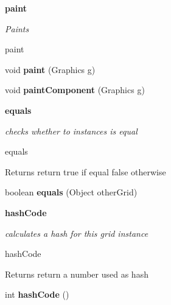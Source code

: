 \begin{Indent}{\bf paint}\par
{\em Paints

paint }\begin{DoxyCompactItemize}
\item 
\hypertarget{classbattleship_1_1gameboard_1_1Grid_ae7aef2ca5af778af7e8582bcaa65d1d0}{}void {\bfseries paint} (Graphics g)\label{classbattleship_1_1gameboard_1_1Grid_ae7aef2ca5af778af7e8582bcaa65d1d0}

\item 
\hypertarget{classbattleship_1_1gameboard_1_1Grid_ad3a041a89cb4f0dc4e754883e577a6f3}{}void {\bfseries paint\+Component} (Graphics g)\label{classbattleship_1_1gameboard_1_1Grid_ad3a041a89cb4f0dc4e754883e577a6f3}

\end{DoxyCompactItemize}
\end{Indent}
\begin{Indent}{\bf equals}\par
{\em checks whether to instances is equal

equals

\begin{DoxyReturn}{Returns}
return true if equal false otherwise 
\end{DoxyReturn}
}\begin{DoxyCompactItemize}
\item 
\hypertarget{classbattleship_1_1gameboard_1_1Grid_a6e7c14de7085a2112c036b4868aba7da}{}boolean {\bfseries equals} (Object other\+Grid)\label{classbattleship_1_1gameboard_1_1Grid_a6e7c14de7085a2112c036b4868aba7da}

\end{DoxyCompactItemize}
\end{Indent}
\begin{Indent}{\bf hash\+Code}\par
{\em calculates a hash for this grid instance

hash\+Code

\begin{DoxyReturn}{Returns}
return a number used as hash 
\end{DoxyReturn}
}\begin{DoxyCompactItemize}
\item 
\hypertarget{classbattleship_1_1gameboard_1_1Grid_a3bc32ab06e3b25af0ed445552624abc1}{}int {\bfseries hash\+Code} ()\label{classbattleship_1_1gameboard_1_1Grid_a3bc32ab06e3b25af0ed445552624abc1}

\end{DoxyCompactItemize}
\end{Indent}



